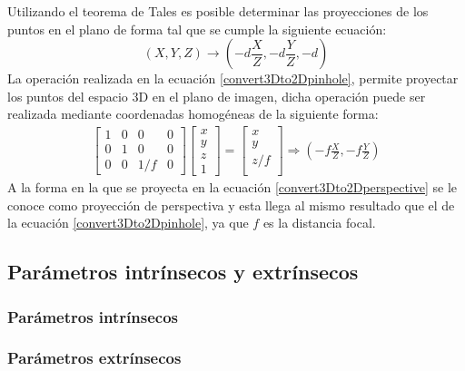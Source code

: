 Utilizando el teorema de Tales es posible determinar las proyecciones de los puntos en el plano de forma tal que se cumple la siguiente ecuación:
\begin{equation}
    (X, Y, Z) \longrightarrow (-d\frac{X}{Z}, -d\frac{Y}{Z}, -d)  \label{convert3Dto2Dpinhole}
\end{equation}
La operación realizada en la ecuación \ref{convert3Dto2Dpinhole}, permite proyectar los puntos del espacio 3D en el plano de imagen, dicha operación puede ser realizada mediante coordenadas homogéneas de la siguiente forma:
\begin{align}
            \begin{bmatrix}
            1 & 0 & 0 & 0\\
            0 & 1 & 0 & 0\\
            0 & 0 & 1/f & 0
            \end{bmatrix}
            \begin{bmatrix}
            x\\
            y\\
            z\\
            1
            \end{bmatrix}
            =
            \begin{bmatrix}
            x\\
            y\\
            z/f\\
            \end{bmatrix} \Rightarrow \left(-f\frac{X}{Z}, -f\frac{Y}{Z}\right)\label{convert3Dto2Dperspective}
\end{align}
A la forma en la que se proyecta en la ecuación \ref{convert3Dto2Dperspective} se le conoce como proyección de perspectiva y esta llega al mismo resultado que el de la ecuación \ref{convert3Dto2Dpinhole}, ya que $f$ es la distancia focal.
\subsection{Parámetros intrínsecos y extrínsecos}
\subsubsection{Parámetros intrínsecos}
\subsubsection{Parámetros extrínsecos}
